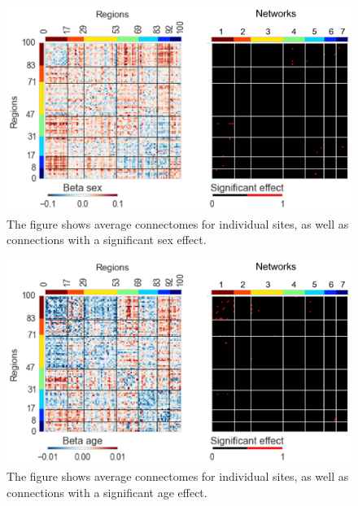 \documentclass[authoryear]{elsarticle}
\begin{document}
\begin{figure}[htbp]
\begin{center}
\includegraphics[width=\linewidth]{../figures/effect_sex.png}
\end{center}
\caption[Connectome variability across sites]{
The figure shows average connectomes for individual sites, as well as connections with a significant sex effect.
}
\label{fig_connectome_variability_sex}
\end{figure}

\begin{figure}[htbp]
\begin{center}
\includegraphics[width=\linewidth]{../figures/effect_age.png}
\end{center}
\caption[Connectome variability across sites]{
The figure shows average connectomes for individual sites, as well as connections with a significant age effect.
}
\label{fig_connectome_variability_age}
\end{figure}
\end{document}
